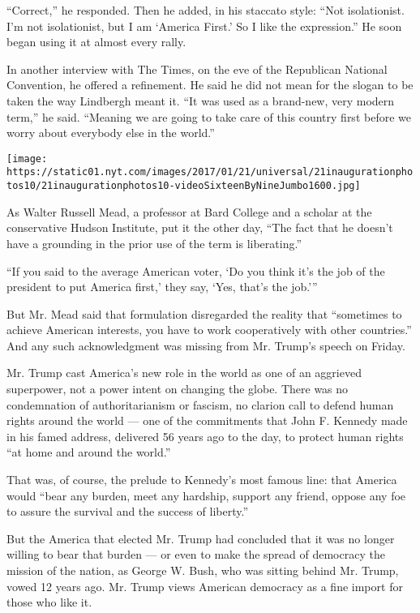 ``Correct,'' he responded. Then he added, in his staccato style: ``Not
isolationist. I'm not isolationist, but I am `America First.' So I like
the expression.'' He soon began using it at almost every rally.

In another interview with The Times, on the eve of the Republican
National Convention, he offered a refinement. He said he did not mean
for the slogan to be taken the way Lindbergh meant it. ``It was used as
a brand-new, very modern term,'' he said. ``Meaning we are going to take
care of this country first before we worry about everybody else in the
world.''

\texttt{[image: https://static01.nyt.com/images/2017/01/21/universal/21inaugurationphotos10/21inaugurationphotos10-videoSixteenByNineJumbo1600.jpg]}

As Walter Russell Mead, a professor at Bard College and a scholar at the
conservative Hudson Institute, put it the other day, ``The fact that he
doesn't have a grounding in the prior use of the term is liberating.''

``If you said to the average American voter, `Do you think it's the job
of the president to put America first,' they say, `Yes, that's the
job.'''

But Mr. Mead said that formulation disregarded the reality that
``sometimes to achieve American interests, you have to work
cooperatively with other countries.'' And any such acknowledgment was
missing from Mr. Trump's speech on Friday.

Mr. Trump cast America's new role in the world as one of an aggrieved
superpower, not a power intent on changing the globe. There was no
condemnation of authoritarianism or fascism, no clarion call to defend
human rights around the world --- one of the commitments that John F.
Kennedy made in his famed address, delivered 56 years ago to the day, to
protect human rights ``at home and around the world.''

That was, of course, the prelude to Kennedy's most famous line: that
America would ``bear any burden, meet any hardship, support any friend,
oppose any foe to assure the survival and the success of liberty.''

But the America that elected Mr. Trump had concluded that it was no
longer willing to bear that burden --- or even to make the spread of
democracy the mission of the nation, as George W. Bush, who was sitting
behind Mr. Trump, vowed 12 years ago. Mr. Trump views American democracy
as a fine import for those who like it.

